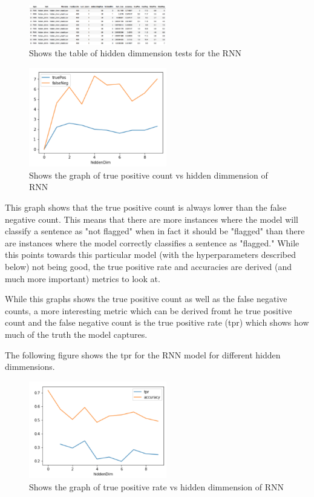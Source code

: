 \documentclass[twoside,twocolumn]{article}
\begin{document}
\begin{figure}[h]
\includegraphics[width=6cm]{hidden_dimm_test_table}
\centering
\caption{Shows the table of hidden dimmension tests for the RNN}
\end{figure}

\begin{figure}[h]
\includegraphics[width=6cm]{hidden_dimm_test_graph}
\centering
\caption{Shows the graph of true positive count vs hidden dimmension of RNN}
\end{figure}

This graph shows that the true positive count is always lower than the false negative count.
This means that there are more instances where the model will classify a sentence as "not flagged"
when in fact it should be "flagged" than there are instances where the model correctly classifies
a sentence as "flagged." While this points towards this particular model
(with the hyperparameters described below) not being good, the true positive rate and accuracies are
derived (and much more important) metrics to look at.

While this graphs shows the true positive count as well as the false negative counts,
a more interesting metric which can be derived fromt he true positive count and
the false negative count is the true positive rate (tpr) which shows how much 
of the truth the model captures.

The following figure shows the tpr for the RNN model for different hidden dimmensions.

\begin{figure}[h]
\includegraphics[width=6cm]{hidden_dimm_test_tpr-graph}
\centering
\caption{Shows the graph of true positive rate vs hidden dimmension of RNN}
\end{figure}
\end{document}

